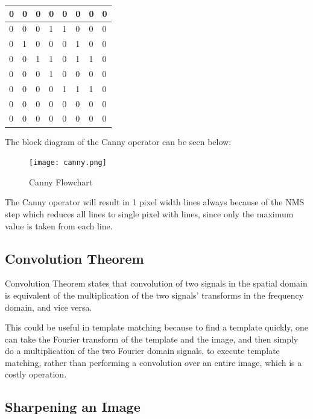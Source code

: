 \documentclass[12pt, letterpaper]{article}
\begin{document}
\begin{table}[!ht]
    \centering
    \begin{tabular}{|l|l|l|l|l|l|l|l|}
    \hline
        0 & 0 & 0 & 0 & 0 & 0 & 0 & 0 \\ \hline
        0 & 0 & 0 & 1 & 1 & 0 & 0 & 0 \\ \hline
        0 & 1 & 0 & 0 & 0 & 1 & 0 & 0 \\ \hline
        0 & 0 & 1 & 1 & 0 & 1 & 1 & 0 \\ \hline
        0 & 0 & 0 & 1 & 0 & 0 & 0 & 0 \\ \hline
        0 & 0 & 0 & 0 & 1 & 1 & 1 & 0 \\ \hline
        0 & 0 & 0 & 0 & 0 & 0 & 0 & 0 \\ \hline
        0 & 0 & 0 & 0 & 0 & 0 & 0 & 0 \\ \hline
    \end{tabular}
\end{table}

The block diagram of the Canny operator can be seen below:

\begin{figure}[H]
    \centering
    \texttt{[image: canny.png]}
    \caption{Canny Flowchart}
\end{figure}

The Canny operator will result in 1 pixel width lines always because of the NMS step which reduces all lines to single pixel with lines, since only the maximum value is taken from each line.

\subsection{Convolution Theorem}

Convolution Theorem states that convolution of two signals in the spatial domain is equivalent of the multiplication of the two signals' transforms in the frequency domain, and vice versa.

This could be useful in template matching because to find a template quickly, one can take the Fourier transform of the template and the image, and then simply do a multiplication of the two Fourier domain signals, to execute template matching, rather than performing a convolution over an entire image, which is a costly operation.


\subsection{Sharpening an Image}
\end{document}
